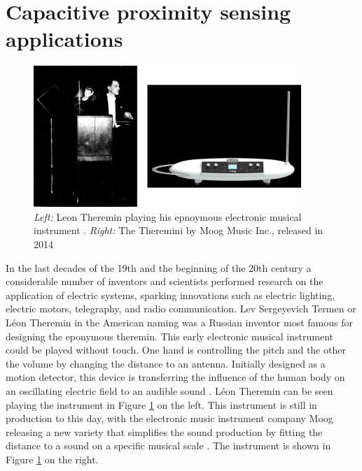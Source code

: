 \section{Capacitive proximity sensing applications}
\begin{figure}[h]
\centering
\includegraphics[width=0.9\textwidth]{images/theremins}
\caption{\emph{Left:} Leon Theremin playing his epnoymous electronic musical instrument \cite{Glinsky2000}. \emph{Right:} The Theremini by Moog Music Inc., released in 2014 \cite{moog2014}}
\label{fig:theremins}
\end{figure}
In the last decades of the 19th and the beginning of the 20th century a considerable number of inventors and scientists performed research on the application of electric systems, sparking innovations such as electric lighting, electric motors, telegraphy, and radio communication. Lev Sergeyevich Termen or Léon Theremin in the American naming was a Russian inventor most famous for designing the eponymous theremin. This early electronic musical instrument could be played without touch. One hand is controlling the pitch and the other the volume by changing the distance to an antenna. Initially designed as a motion detector, this device is transferring the influence of the human body on an oscillating electric field to an audible sound \cite{Glinsky2000}. Léon Theremin can be seen playing the instrument in Figure \ref{fig:theremins} on the left. This instrument is still in production to this day, with the electronic music instrument company Moog releasing a new variety that simplifies the sound production by fitting the distance to a sound on a specific musical scale \cite{moog2014}. The instrument is shown in Figure \ref{fig:theremins} on the right.

